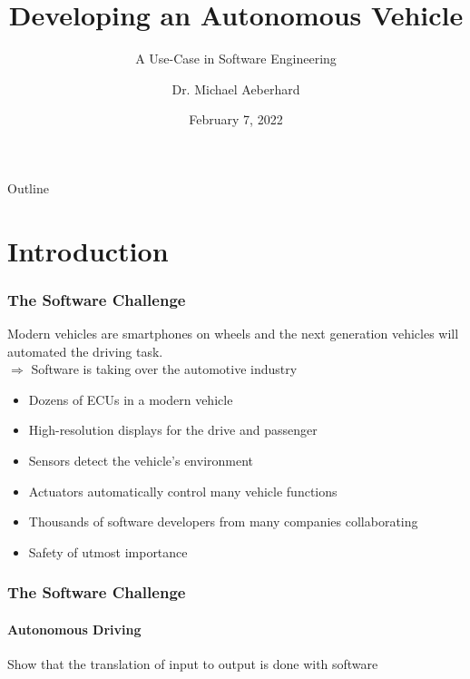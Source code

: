 \documentclass[aspectratio=169]{beamer}
\title{Developing an Autonomous Vehicle}
\subtitle{A Use-Case in Software Engineering}
\author{Dr. Michael Aeberhard}
\date{February 7, 2022}
\begin{document}
\frame{\titlepage}

\begin{frame}{Outline}
    \tableofcontents[hideallsubsections]
\end{frame}


\section{Introduction}





\begin{frame}
\frametitle{The Software Challenge}
Modern vehicles are smartphones on wheels and the next generation vehicles
will automated the driving task.\\
$\Rightarrow$ Software is taking over the automotive industry
\vspace{0.25cm}
\begin{itemize}
    \item Dozens of ECUs in a modern vehicle
    \item High-resolution displays for the drive and passenger
    \item Sensors detect the vehicle's environment
    \item Actuators automatically control many vehicle functions
    \item Thousands of software developers from many companies collaborating
    \item Safety of utmost importance
\end{itemize}
\end{frame}

\begin{frame}
\frametitle{The Software Challenge}
\framesubtitle{Autonomous Driving}
Show that the translation of input to output is done with software
\end{frame}
\end{document}

